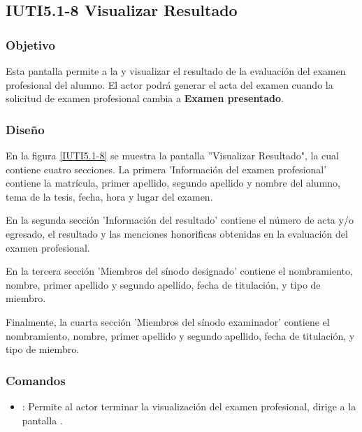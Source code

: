 \subsection{IUTI5.1-8 Visualizar Resultado}

\subsubsection{Objetivo}

	Esta pantalla permite a la  y  visualizar el resultado de la evaluación del examen profesional del alumno. 
	El actor podrá generar el acta del examen  cuando la solicitud de examen profesional cambia a \textbf{Examen presentado}.

\subsubsection{Diseño}

    En la figura \ref{IUTI5.1-8} se muestra la pantalla ''Visualizar Resultado", la cual contiene cuatro secciones. La primera 'Información del examen profesional' contiene la matrícula, primer apellido, segundo apellido y nombre del alumno, tema de la tesis, fecha, hora y lugar del examen.
    
    En la segunda sección 'Información del resultado' contiene el número de acta y/o egresado, el resultado y las menciones honorificas obtenidas en la evaluación del examen profesional. 
    
    En la tercera sección 'Miembros del sínodo designado' contiene el nombramiento, nombre, primer apellido y segundo apellido, fecha de titulación, y tipo de miembro.

	Finalmente, la cuarta sección 'Miembros del sínodo examinador' contiene el nombramiento, nombre, primer apellido y segundo apellido, fecha de titulación, y tipo de miembro.  
	   

\subsubsection{Comandos}

	\begin{itemize}
		
		\item {}: Permite al actor terminar la visualización del examen profesional, dirige a la pantalla .
		
	\end{itemize}


